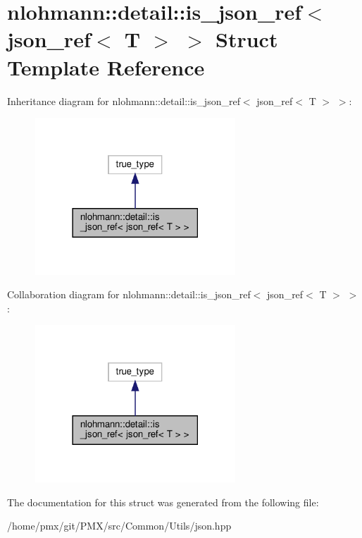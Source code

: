 \hypertarget{structnlohmann_1_1detail_1_1is__json__ref_3_01json__ref_3_01T_01_4_01_4}{}\section{nlohmann\+:\+:detail\+:\+:is\+\_\+json\+\_\+ref$<$ json\+\_\+ref$<$ T $>$ $>$ Struct Template Reference}
\label{structnlohmann_1_1detail_1_1is__json__ref_3_01json__ref_3_01T_01_4_01_4}


Inheritance diagram for nlohmann\+:\+:detail\+:\+:is\+\_\+json\+\_\+ref$<$ json\+\_\+ref$<$ T $>$ $>$\+:
\nopagebreak
\begin{figure}[H]
\begin{center}
\leavevmode
\includegraphics[width=213pt]{structnlohmann_1_1detail_1_1is__json__ref_3_01json__ref_3_01T_01_4_01_4__inherit__graph}
\end{center}
\end{figure}


Collaboration diagram for nlohmann\+:\+:detail\+:\+:is\+\_\+json\+\_\+ref$<$ json\+\_\+ref$<$ T $>$ $>$\+:
\nopagebreak
\begin{figure}[H]
\begin{center}
\leavevmode
\includegraphics[width=213pt]{structnlohmann_1_1detail_1_1is__json__ref_3_01json__ref_3_01T_01_4_01_4__coll__graph}
\end{center}
\end{figure}


The documentation for this struct was generated from the following file\+:\begin{DoxyCompactItemize}
\item 
/home/pmx/git/\+P\+M\+X/src/\+Common/\+Utils/json.\+hpp\end{DoxyCompactItemize}
